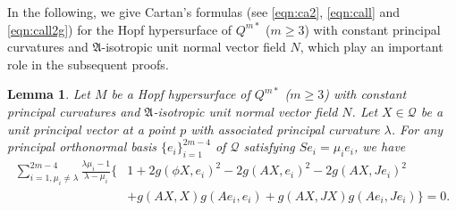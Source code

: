 \documentclass[reqno]{amsart}%
\newtheorem{lemma}[theorem]{Lemma}
\theoremstyle{definition}
\newtheorem{corollary}[theorem]{Corollary}
\numberwithin{equation}{section}
\begin{document}


In the following, we give Cartan's formulas (see \eqref{eqn:ca2}, \eqref{eqn:call}
and \eqref{eqn:call2g}) for the Hopf hypersurface of $Q^{m*}$ ($m\geq3$) with constant principal curvatures and $\mathfrak{A}$-isotropic unit normal vector field $N$, which play an important role in the subsequent proofs.

\begin{lemma}\label{lemma:5.3}
Let $M$ be a Hopf hypersurface of $Q^{m*}$ ($m\geq3$) with constant principal curvatures and $\mathfrak{A}$-isotropic unit normal vector field $N$. Let $X\in \mathcal{Q}$ be a unit principal vector at a point $p$ with
associated principal curvature $\lambda$. For any principal orthonormal basis $\{e_i\}_{i=1}^{2m-4}$ of
$\mathcal{Q}$ satisfying $Se_i=\mu_ie_i$, we have
%
\begin{equation}\label{eqn:ca2}
\begin{aligned}
\sum_{i=1, \mu_i\neq\lambda}^{2m-4}\frac{\lambda\mu_i-1}{\lambda-\mu_i}\Big\{&1+2g(\phi X,e_i)^2-2g(AX,e_i)^2-2g(AX,Je_i)^2\\
&+g(AX,X)g(Ae_i,e_i)+g(AX,JX)g(Ae_i,Je_i)\Big\}=0.
\end{aligned}
\end{equation}
\end{lemma}
%
\end{document}
